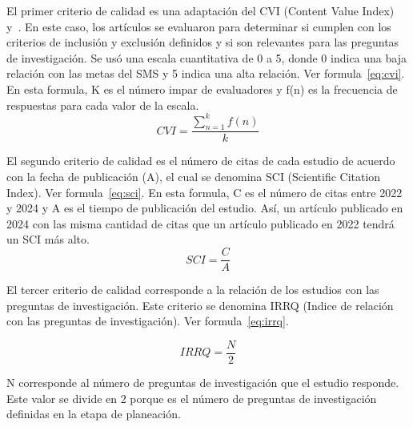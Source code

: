 El primer criterio de calidad es una adaptación del CVI (Content Value Index)~\cite{almanasreh2019evaluation} y~\cite{yaghmaei2003content}.
En este caso, los artículos se evaluaron para determinar si cumplen con los criterios de inclusión y exclusión definidos y si son relevantes para las preguntas de investigación. Se usó una escala cuantitativa de 0 a 5, donde 0 indica una baja relación con las metas del SMS y 5 indica una alta relación.
Ver formula~\ref{eq:cvi}. En esta formula, K es el número impar de evaluadores y f(n) es la frecuencia de respuestas para cada valor de la escala.\\

\begin{equation}
\label{eq:cvi}
CVI = \frac{\sum_{n=1}^{k} f(n)}{k}
\end{equation}

El segundo criterio de calidad es el número de citas de cada estudio de acuerdo con la fecha de publicación (A), el cual se denomina SCI (Scientific Citation Index). Ver formula~\ref{eq:sci}. En esta formula, C es el número de citas entre 2022 y 2024 y A es el tiempo de publicación del estudio. Así, un artículo publicado en 2024 con las misma cantidad de citas que un artículo publicado en 2022 tendrá un SCI más alto.\\

\begin{equation}
\label{eq:sci}
SCI = \frac{C}{A}
\end{equation}

El tercer criterio de calidad corresponde a la relación de los estudios con las preguntas de investigación. Este criterio se denomina IRRQ (Indice de relación con las preguntas de investigación). Ver formula~\ref{eq:irrq}. 

\begin{equation}
\label{eq:irrq}
IRRQ = \frac{N}{2}
\end{equation}

N corresponde al número de preguntas de investigación que el estudio responde. Este valor se divide en 2 porque es el número de preguntas de investigación definidas en la etapa de planeación.\\